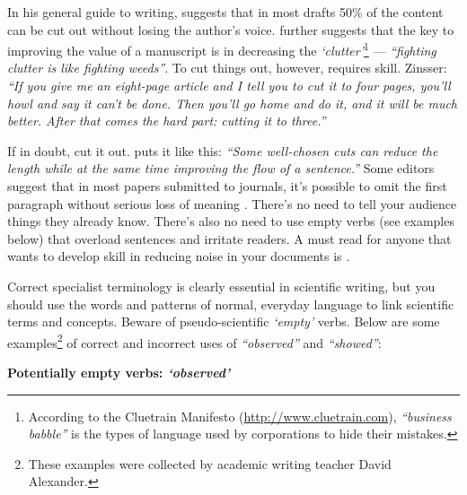 \documentclass[graybox,envcountchap,sectrefs,UStrade]{svmono}
\begin{document}
In his general guide to writing, \citet{Zinsser2006} suggests that in most drafts 50\% of the content can be cut out without losing the author's voice. \citet{Zinsser2006} further suggests that the key to improving the value of a manuscript is in decreasing the \emph{`clutter'}\footnote{According to the Cluetrain Manifesto (\url{http://www.cluetrain.com}),  \emph{``business babble''} is the types of language used by corporations to hide their mistakes.} --- \emph{``fighting clutter is like fighting weeds''}. To cut things out, however, requires skill. Zinsser: \emph{``If you give me an eight-page article and I tell you to cut it to four pages, you'll howl and say it can't be done. Then you'll go home and do it, and it will be much better. After that comes the hard part: cutting it to three.''} \par

If in doubt, cut it out. \citet{Creedy2008research} puts it like this: \emph{``Some well-chosen cuts can reduce the length while at the same time improving the flow of a sentence.''} Some editors suggest that in most papers submitted to journals, it's possible to omit the first paragraph without serious loss of meaning \citep{Creedy2008research}. There's no need to tell your audience things they already know. There's also no need to use empty verbs (see examples below) that overload sentences and irritate readers. A must read for anyone that wants to develop skill in reducing noise in your documents is \citet{dupre1998bugs}.\par

Correct specialist terminology is clearly essential in scientific writing, but you should use the words and patterns of normal, everyday language to link scientific terms and concepts. Beware of pseudo-scientific \emph{`empty'} verbs. Below are some examples\footnote{These examples were collected by academic writing teacher David Alexander.} of correct and incorrect uses of \emph{``observed''} and \emph{``showed''}:

\begin{flushleft}
\textbf{Potentially empty verbs: \emph{`observed'}}
\end{flushleft}
\end{document}
